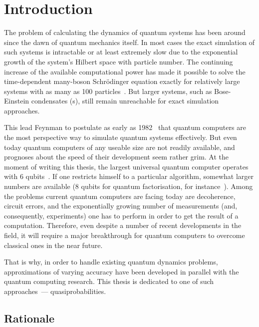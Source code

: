 \chapter{Introduction}

The problem of calculating the dynamics of quantum systems has been around since the dawn of quantum mechanics itself.
In most cases the exact simulation of such systems is intractable or at least extremely slow due to the exponential growth of the system's Hilbert space with particle number.
The continuing increase of the available computational power has made it possible to solve the time-dependent many-boson Schr\"odinger equation exactly for relatively large systems with as many as 100 particles~\cite{Sakmann2009}.
But larger systems, such as Bose-Einstein condensates (s), still remain unreachable for exact simulation approaches.

This lead Feynman to postulate as early as 1982~\cite{Feynman1982} that quantum computers are the most perspective way to simulate quantum systems effectively.
But even today quantum computers of any useable size are not readily available, and prognoses about the speed of their development seem rather grim.
At the moment of writing this thesis, the largest universal quantum computer operates with 6 qubits~\cite{Lanyon2011}.
If one restricts himself to a particular algorithm, somewhat larger numbers are available (8 qubits for quantum factorisation, for instance~\cite{Xu2012}).
Among the problems current quantum computers are facing today are decoherence, circuit errors, and the exponentially growing number of measurements (and, consequently, experiments) one has to perform in order to get the result of a computation.
Therefore, even despite a number of recent developments in the field, it will require a major breakthrough for quantum computers to overcome classical ones in the near future.

That is why, in order to handle existing quantum dynamics problems, approximations of varying accuracy have been developed in parallel with the quantum computing research.
This thesis is dedicated to one of such approaches~--- quasiprobabilities.


\section{Rationale}

